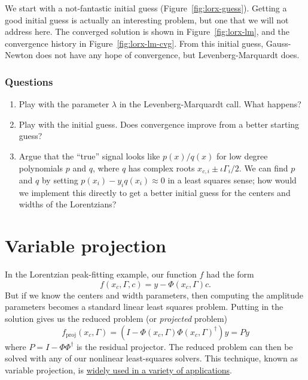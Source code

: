 \documentclass[12pt, leqno]{article} %
\providecommand{\tightlist}{%
  \setlength{\itemsep}{0pt}\setlength{\parskip}{0pt}}
\begin{document}
We start with a not-fantastic initial guess
(Figure~\ref{fig:lorx-guess}).  Getting a good initial guess is
actually an interesting problem, but one that we will not address
here.  The converged solution is shown in Figure~\ref{fig:lorx-lm},
and the convergence history in Figure~\ref{fig:lorx-lm-cvg}.  From
this initial guess, Gauss-Newton does not have any hope of
convergence, but Levenberg-Marquardt does.

\subsubsection{Questions}

\begin{enumerate}
\def\labelenumi{\arabic{enumi}.}
\tightlist
\item
  Play with the parameter \(\lambda\) in the Levenberg-Marquardt call.
  What happens?
\item
  Play with the initial guess. Does convergence improve from a better
  starting guess?
\item
  Argue that the ``true'' signal looks like \(p(x)/q(x)\) for low degree
  polynomials \(p\) and \(q\), where \(q\) has complex roots
  \(x_{c,i} \pm \iota \Gamma_i/2\). We can find \(p\) and \(q\) by
  setting \(p(x_i) - y_i q(x_i) \approx 0\) in a least squares sense;
  how would we implement this directly to get a better initial guess for
  the centers and widths of the Lorentzians?
\end{enumerate}

\section{Variable projection}

In the Lorentzian peak-fitting example, our function \(f\) had the form
\[f(x_c, \Gamma, c) = y-\Phi(x_c, \Gamma) c.\] But if we know the
centers and width parameters, then computing the amplitude parameters
becomes a standard linear least squares problem. Putting in the solution
gives us the reduced problem (or \emph{projected} problem)
\[f_{\mathrm{proj}}(x_c, \Gamma) = 
  \left( I-\Phi(x_c, \Gamma) \Phi(x_c, \Gamma)^\dagger \right) y = Py\]
where \(P = I-\Phi \Phi^\dagger\) is the residual projector. The reduced
problem can then be solved with any of our nonlinear least-squares
solvers. This technique, known as variable projection, is
\href{http://stacks.iop.org/IP/19/R1}{widely used in a variety of
applications}.
\end{document}
